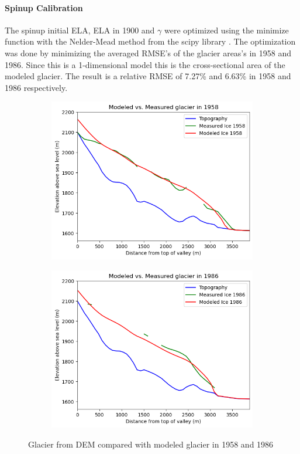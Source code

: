 \documentclass{article}
\begin{document}
\paragraph{Spinup Calibration}
The spinup initial ELA, ELA in 1900 and $\gamma$ were optimized using the minimize function with the Nelder-Mead method from the scipy library \cite{ref9}.
The optimization was done by minimizing the averaged RMSE's of the glacier areas's in 1958 and 1986. Since this is a 1-dimensional model this is the 
cross-sectional area of the modeled glacier. The result is a relative RMSE of 7.27\% and 6.63\% in 1958 and 1986 respectively.
\begin{figure}[h]
    \centering
    \begin{subfigure}[b]{0.49\textwidth}
        \centering
        \includegraphics[width=\textwidth]{Plots/1958_glacier_comparison.png}
        \label{fig:1958_glacier_comparison}
    \end{subfigure}
    \hfill
    \begin{subfigure}[b]{0.49\textwidth}
        \centering
        \includegraphics[width=\textwidth]{Plots/1986_glacier_comparison.png}
        \label{fig:v}
    \end{subfigure}
    \caption{Glacier from DEM compared with modeled glacier in 1958 and 1986}
    \label{fig:1986_glacier_comparison}
\end{figure}
\end{document}
